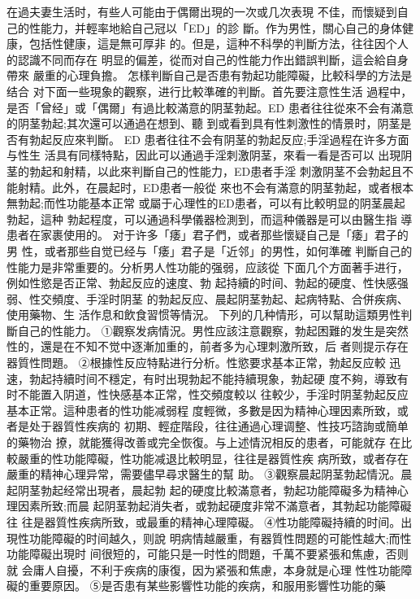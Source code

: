 \documentclass[12pt,UTF8]{ctexbook}
\begin{document}
在過夫妻生活时，有些人可能由于偶爾出現的一次或几次表現
不佳，而懷疑到自己的性能力，并輕率地給自己冠以「ED」的診
斷。作为男性，關心自己的身体健康，包括性健康，這是無可厚非
的。但是，這种不科學的判斷方法，往往因个人的認識不同而存在
明显的偏差，從而对自己的性能力作出錯誤判斷，這会給自身帶來
嚴重的心理負擔。
怎樣判斷自己是否患有勃起功能障礙，比較科學的方法是结合
对下面一些現象的觀察，进行比較準確的判斷。首先要注意性生活
過程中，是否「曾经」或「偶爾」有過比較滿意的阴茎勃起。ED
患者往往從來不会有滿意的阴茎勃起;其次還可以通過在想到、聽
到或看到具有性刺激性的情景时，阴茎是否有勃起反应來判斷。
ED 患者往往不会有阴茎的勃起反应;手淫過程在许多方面与性生
活具有同樣特點，因此可以通過手淫刺激阴茎，來看一看是否可以
出現阴茎的勃起和射精，以此來判斷自己的性能力，ED患者手淫
刺激阴茎不会勃起且不能射精。此外，在晨起时，ED患者一般從
來也不会有滿意的阴茎勃起，或者根本無勃起;而性功能基本正常
或屬于心理性的ED患者，可以有比較明显的阴茎晨起勃起，這种
勃起程度，可以通過科學儀器检測到，而這种儀器是可以由醫生指
導患者在家裹使用的。
对于许多「痿」君子們，或者那些懷疑自己是「痿」君子的男
性，或者那些自觉已经与「痿」君子是「近邻」的男性，如何準確
判斷自己的性能力是非常重要的。分析男人性功能的强弱，应該從
下面几个方面著手进行，例如性慾是否正常、勃起反应的速度、勃
起持續的时间、勃起的硬度、性快感强弱、性交頻度、手淫时阴茎
的勃起反应、晨起阴茎勃起、起病特點、合併疾病、使用藥物、生
活作息和飲食習惯等情況。
下列的几种情形，可以幫助這類男性判斷自己的性能力。
①觀察发病情況。男性应該注意觀察，勃起困難的发生是突然
性的，還是在不知不觉中逐漸加重的，前者多为心理刺激所致，后
者则提示存在器質性問題。
②根據性反应特點进行分析。性慾要求基本正常，勃起反应較
迅速，勃起持續时间不穩定，有时出現勃起不能持續現象，勃起硬
度不夠，導致有时不能置入阴道，性快感基本正常，性交頻度較以
往較少，手淫时阴茎勃起反应基本正常。這种患者的性功能减弱程
度輕微，多數是因为精神心理因素所致，或者是处于器質性疾病的
初期、輕症階段，往往通過心理调整、性技巧諮詢或簡单的藥物治
撩，就能獲得改善或完全恢復。与上述情況相反的患者，可能就存
在比較嚴重的性功能障礙，性功能减退比較明显，往往是器質性疾
病所致，或者存在嚴重的精神心理异常，需要儘早尋求醫生的幫
助。
③觀察晨起阴茎勃起情況。晨起阴茎勃起经常出現者，晨起勃
起的硬度比較滿意者，勃起功能障礙多为精神心理因素所致;而晨
起阴茎勃起消失者，或勃起硬度非常不滿意者，其勃起功能障礙往
往是器質性疾病所致，或最重的精神心理障礙。
④性功能障礙持續的时间。出現性功能障礙的时间越久，则說
明病情越嚴重，有器質性問题的可能性越大;而性功能障礙出現时
间很短的，可能只是一时性的問題，千萬不要紧張和焦慮，否则就
会庸人自擾，不利于疾病的康復，因为紧張和焦慮，本身就是心理
性性功能障礙的重要原因。
⑤是否患有某些影響性功能的疾病，和服用影響性功能的藥
\end{document}
